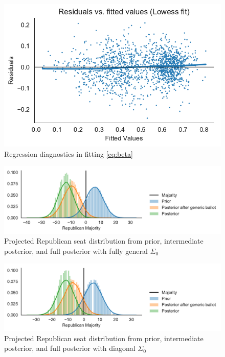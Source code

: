 \documentclass[12pt, letterpaper]{article}
\begin{document}
\begin{figure}[tbh]
  \centering
  \includegraphics{diagnostics.pdf}
  \caption{Regression diagnostics in fitting \eqref{eq:beta}}
  \label{fig:diag}
\end{figure}

\begin{figure}[tbh]
  \centering
  \includegraphics[width=\textwidth]{rep_seats.pdf}
  \caption{Projected Republican seat distribution from prior, intermediate
  posterior, and full posterior with fully general $\Sigma_0$}
  \label{fig:hists}
\end{figure}

\begin{figure}[tbh]
  \centering
  \includegraphics[width=\textwidth]{rep_seats_with_diagonal_prior.pdf}
  \caption{Projected Republican seat distribution from prior, intermediate
  posterior, and full posterior with diagonal $\Sigma_0$}
  \label{fig:diagonal_prior}
\end{figure}
\end{document}
